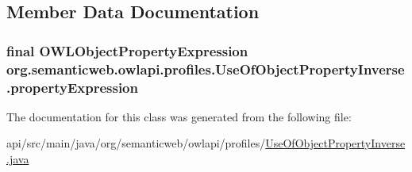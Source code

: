 \subsection{Member Data Documentation}
\hypertarget{classorg_1_1semanticweb_1_1owlapi_1_1profiles_1_1_use_of_object_property_inverse_a2e2de856b7aff63500b72f8cf72df240}{
\subsubsection[{property\-Expression}]{\setlength{\rightskip}{0pt plus 5cm}final {\bf O\-W\-L\-Object\-Property\-Expression} org.\-semanticweb.\-owlapi.\-profiles.\-Use\-Of\-Object\-Property\-Inverse.\-property\-Expression\hspace{0.3cm}{\ttfamily [private]}}}\label{classorg_1_1semanticweb_1_1owlapi_1_1profiles_1_1_use_of_object_property_inverse_a2e2de856b7aff63500b72f8cf72df240}


The documentation for this class was generated from the following file\-:\begin{DoxyCompactItemize}
\item 
api/src/main/java/org/semanticweb/owlapi/profiles/\hyperlink{_use_of_object_property_inverse_8java}{Use\-Of\-Object\-Property\-Inverse.\-java}\end{DoxyCompactItemize}

